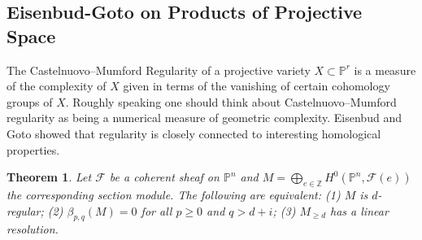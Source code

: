 \documentclass[11pt,reqno]{amsart}
\newtheorem{theorem}[lemma]{Theorem}
\theoremstyle{remark}
\newcommand{\PP}{\mathbb{P}}
\newcommand{\ZZ}{\mathbb{Z}}
\newcommand{\cF}{\mathcal{F}}
\newcommand{\cO}{\mathcal{O}}
\begin{document}
%
%
%


\subsection{Eisenbud-Goto on Products of Projective Space}\label{subsec:prior:homological-algebra-on-toric}

The Castelnuovo--Mumford Regularity of a projective variety $X\subset \PP^{r}$ is a measure of the complexity of $X$ given in terms of the vanishing of certain cohomology groups of $X$. Roughly speaking one should think about Castelnuovo--Mumford regularity as being a numerical measure of geometric complexity. Eisenbud and Goto showed that regularity is closely connected to interesting homological properties.

\begin{theorem}\cite{eisenbudGoto84}\label{thm:eisenbud-goto}
Let $\cF$ be a coherent sheaf on $\PP^{n}$ and $M=\bigoplus_{e\in\ZZ} H^0(\PP^{n},\cF(e))$ the corresponding section module. The following are equivalent: (1) $M$ is $d$-regular; (2) $\beta_{p,q}(M)=0$ for all $p\geq0$ and $q>d+i$; (3) $M_{\geq d}$ has a linear resolution. 
\end{theorem}
\end{document}
